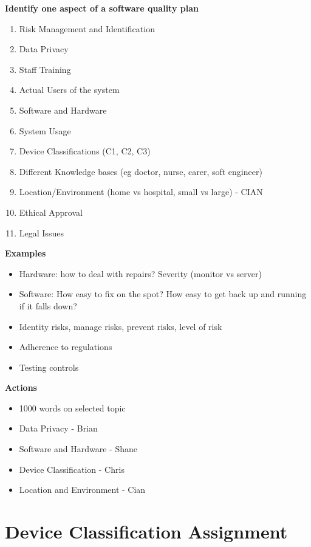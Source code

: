 \textbf{Identify one aspect of a software quality plan}
\begin{enumerate}
\item Risk Management and Identification
\item Data Privacy 
\item Staff Training
\item Actual Users of the system
\item Software and Hardware
\item System Usage
\item Device Classifications (C1, C2, C3)
\item Different Knowledge bases (eg doctor, nurse, carer, soft engineer)
\item Location/Environment (home vs hospital, small vs large) - CIAN
\item Ethical Approval
\item Legal Issues
\end{enumerate}

\textbf{Examples}
\begin{itemize}
\item Hardware: how to deal with repairs? Severity (monitor vs server)
\item Software: How easy to fix on the spot? How easy to get back up and running if it falls down?
\item Identity risks, manage risks, prevent risks, level of risk
\item Adherence to regulations
\item Testing controls
\end{itemize}

\textbf{Actions}
\begin{itemize}
\item 1000 words on selected topic
\item Data Privacy - Brian
\item Software and Hardware - Shane
\item Device Classification - Chris
\item Location and Environment - Cian
\end{itemize}

\section{Device Classification Assignment}

